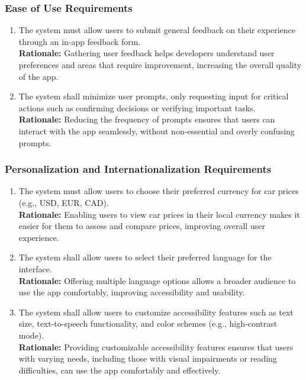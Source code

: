 \documentclass[]{article}
\begin{document}
\subsubsection{Ease of Use Requirements}
\label{ssub:ease_of_use_requirements}
\begin{enumerate}[{UH-EOU}1. ]
    \item The system must allow users to submit general feedback on their experience through an in-app feedback form.\\
    \textbf{Rationale:} Gathering user feedback helps developers understand user preferences and areas that require improvement, increasing the overall quality of the app.
    \item The system shall minimize user prompts, only requesting input for critical actions such as confirming decisions or verifying important tasks.\\
    \textbf{Rationale:} Reducing the frequency of prompts ensures that users can interact with the app seamlessly, without non-essential and overly confusing prompts.

\end{enumerate}

\subsubsection{Personalization and Internationalization Requirements}
\label{ssub:personalization_and_internationalization_requirements}
\begin{enumerate}[{UH-PI}1. ]
    \item The system must allow users to choose their preferred currency for car prices (e.g., USD, EUR, CAD).\\
    \textbf{Rationale:} Enabling users to view car prices in their local currency makes it easier for them to assess and compare prices, improving overall user experience.
    \item The system shall allow users to select their preferred language for the interface.\\
    \textbf{Rationale:} Offering multiple language options allows a broader audience to use the app comfortably, improving accessibility and usability.
    \item The system shall allow users to customize accessibility features such as text size, text-to-speech functionality, and color schemes (e.g., high-contrast mode).\\
    \textbf{Rationale:} Providing customizable accessibility features ensures that users with varying needs, including those with visual impairments or reading difficulties, can use the app comfortably and effectively.

\end{enumerate}
\end{document}
